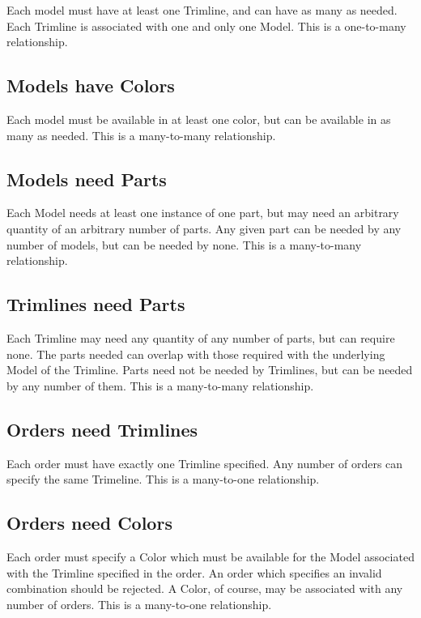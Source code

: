 \documentclass[11pt,letterpaper,oneside]{amsart}
\begin{document}
Each model must have at least one Trimline, and can have as many as needed.  Each Trimline is associated with one and only one Model. This is a one-to-many relationship.

\subsection*{Models have Colors}

Each model must be available in at least one color, but can be available in as many as needed.  This is a many-to-many relationship.

\subsection*{Models need Parts}

Each Model needs at least one instance of one part, but may need an arbitrary quantity of an arbitrary number of parts.  Any given part can be needed by any number of models, but can be needed by none.  This is a many-to-many relationship.

\subsection*{Trimlines need Parts}

Each Trimline may need any quantity of any number of parts, but can require none.  The parts needed can overlap with those required with the underlying Model of the Trimline.  Parts need not be needed by Trimlines, but can be needed by any number of them.  This is a many-to-many relationship. 

\subsection*{Orders need Trimlines}

Each order must have exactly one Trimline specified.  Any number of orders can specify the same Trimeline.  This is a many-to-one relationship.

\subsection*{Orders need Colors}

Each order must specify a Color which must be available for the Model associated with the Trimline specified in the order.  An order which specifies an invalid combination should be rejected.  A Color, of course, may be associated with any number of orders.  This is a many-to-one relationship.
\end{document}
